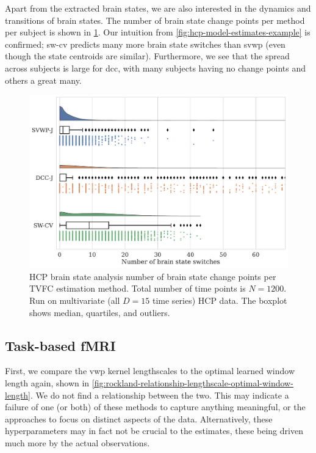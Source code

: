 Apart from the extracted brain states, we are also interested in the dynamics and transitions of brain states.
The number of brain state change points per method per subject is shown in \cref{fig:hcp-brain-state-change-point-counts}.
Our intuition from \cref{fig:hcp-model-estimates-example} is confirmed; \gls{sw-cv} predicts many more brain state switches than \gls{svwp} (even though the state centroids are similar).
Furthermore, we see that the spread across subjects is large for \gls{dcc}, with many subjects having no change points and others a great many.


\begin{figure}[t]
  \centering
  \includegraphics[width=\textwidth]{fig/hcp/d15/brain_states/k03/brain_state_switch_count}
  \caption{
    HCP brain state analysis number of brain state change points per TVFC estimation method.
    Total number of time points is $N = 1200$.
    Run on multivariate (all $D = 15$ time series) HCP data.
    The boxplot shows median, quartiles, and outliers.
  }\label{fig:hcp-brain-state-change-point-counts}
\end{figure}


\subsection{Task-based fMRI}\label{subsec:rockland-results}

First, we compare the \gls{vwp} kernel lengthscales to the optimal learned window length again, shown in \cref{fig:rockland-relationship-lengthscale-optimal-window-length}.
We do not find a relationship between the two.
This may indicate a failure of one (or both) of these methods to capture anything meaningful, or the approaches to focus on distinct aspects of the data.
Alternatively, these hyperparameters may in fact not be crucial to the estimates, these being driven much more by the actual observations.


